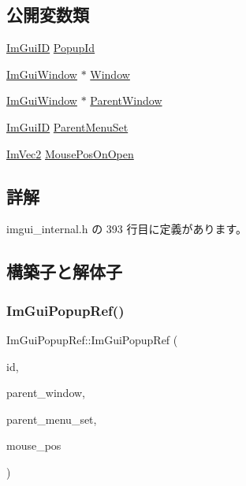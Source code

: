 \subsection*{公開変数類}
\begin{DoxyCompactItemize}
\item 
\mbox{\hyperlink{imgui_8h_a1785c9b6f4e16406764a85f32582236f}{Im\+Gui\+ID}} \mbox{\hyperlink{struct_im_gui_popup_ref_a7037780575e28439414d28625a495bad}{Popup\+Id}}
\item 
\mbox{\hyperlink{struct_im_gui_window}{Im\+Gui\+Window}} $\ast$ \mbox{\hyperlink{struct_im_gui_popup_ref_a471027209038d1d59280a84c8d236f34}{Window}}
\item 
\mbox{\hyperlink{struct_im_gui_window}{Im\+Gui\+Window}} $\ast$ \mbox{\hyperlink{struct_im_gui_popup_ref_a7925cc312e5632661e0e6a2195af21b2}{Parent\+Window}}
\item 
\mbox{\hyperlink{imgui_8h_a1785c9b6f4e16406764a85f32582236f}{Im\+Gui\+ID}} \mbox{\hyperlink{struct_im_gui_popup_ref_afc2fc749bf54a0e3bab8defefe4a0a2b}{Parent\+Menu\+Set}}
\item 
\mbox{\hyperlink{struct_im_vec2}{Im\+Vec2}} \mbox{\hyperlink{struct_im_gui_popup_ref_ae7640a4130be4ba7518aee17c500d366}{Mouse\+Pos\+On\+Open}}
\end{DoxyCompactItemize}


\subsection{詳解}


 imgui\+\_\+internal.\+h の 393 行目に定義があります。



\subsection{構築子と解体子}
\mbox{\label{struct_im_gui_popup_ref_af95848b705864b36b803745cd7b59250}} 
\subsubsection{\texorpdfstring{Im\+Gui\+Popup\+Ref()}{ImGuiPopupRef()}}
{\footnotesize\ttfamily Im\+Gui\+Popup\+Ref\+::\+Im\+Gui\+Popup\+Ref (\begin{DoxyParamCaption}\item[{\mbox{\hyperlink{imgui_8h_a1785c9b6f4e16406764a85f32582236f}{Im\+Gui\+ID}}}]{id,  }\item[{\mbox{\hyperlink{struct_im_gui_window}{Im\+Gui\+Window}} $\ast$}]{parent\+\_\+window,  }\item[{\mbox{\hyperlink{imgui_8h_a1785c9b6f4e16406764a85f32582236f}{Im\+Gui\+ID}}}]{parent\+\_\+menu\+\_\+set,  }\item[{const \mbox{\hyperlink{struct_im_vec2}{Im\+Vec2}} \&}]{mouse\+\_\+pos }\end{DoxyParamCaption})\hspace{0.3cm}{\ttfamily [inline]}}



